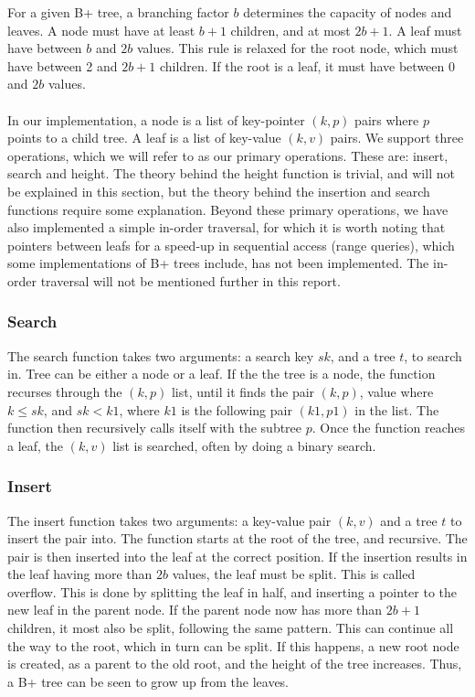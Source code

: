 For a given B+ tree, a branching factor $b$ determines the capacity of nodes and leaves. A node must have at least $b+1$ children, and at most $2b+1$. A leaf must have between $b$ and $2b$ values. This rule is relaxed for the root node, which must have between 2 and $2b+1$ children. If the root is a leaf, it must have between 0 and $2b$ values.

\paragraph{}
In our implementation, a node is a list of key-pointer $(k, p)$ pairs where $p$ points to a child tree. A leaf is a list of key-value $(k, v)$ pairs. We support three operations, which we will refer to as our primary operations. These are: insert, search and height. The theory behind the height function is trivial, and will not be explained in this section, but the theory behind the insertion and search functions require some explanation. Beyond these primary operations, we have also implemented a simple in-order traversal, for which it is worth noting that pointers between leafs for a speed-up in sequential access (range queries), which some implementations of B+ trees include, has not been implemented. The in-order traversal will not be mentioned further in this report.

\subsubsection{Search}
The search function takes two arguments: a search key $sk$, and a tree $t$, to search in. Tree can be either a node or a leaf. If the the tree is a node, the function recurses through the $(k, p)$ list, until it finds the pair $(k, p)$, value where $k \le sk$, and $sk < k1$, where $k1$ is the following pair $(k1, p1)$ in the list. The function then recursively calls itself with the subtree $p$. Once the function reaches a leaf, the $(k, v)$ list is searched, often by doing a binary search.

\subsubsection{Insert}
The insert function takes two arguments: a key-value pair $(k, v)$ and a tree $t$ to insert the pair into. The function starts at the root of the tree, and recursive. The pair is then inserted into the leaf at the correct position. If the insertion results in the leaf having more than $2b$ values, the leaf must be split. This is called overflow. This is done by splitting the leaf in half, and inserting a pointer to the new leaf in the parent node. If the parent node now has more than $2b+1$ children, it most also be split, following the same pattern. This can continue all the way to the root, which in turn can be split. If this happens, a new root node is created, as a parent to the old root, and the height of the tree increases. Thus, a B+ tree can be seen to grow up from the leaves.
